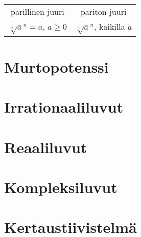 \begin{tabular}{c|c}
parillinen juuri & pariton juuri\\
$\sqrt[n]{a}^n=a$, $a\ge0$ & $\sqrt[n]{a}^n$, kaikilla $a$
\end{tabular}



\chapter{Murtopotenssi}
\chapter{Irrationaaliluvut}
\chapter{Reaaliluvut}
\chapter{Kompleksiluvut}
\chapter{Kertaustiivistelmä}
